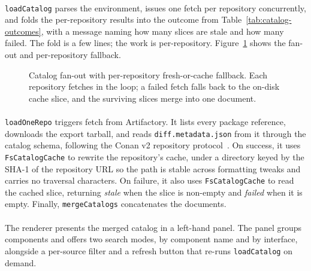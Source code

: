 \paragraph{}
\texttt{loadCatalog} parses the environment, issues one fetch per repository concurrently, and folds the per-repository results into the outcome from Table~\ref{tab:catalog-outcomes}, with a message naming how many slices are stale and how many failed. The fold is a few lines; the work is per-repository. Figure~\ref{fig:catalog-sequence} shows the fan-out and per-repository fallback.
\begin{figure}[H]
    \centering
    \resizebox{\textwidth}{!}{
        
    }
    \caption[Catalog fan-out with per-repository fresh-or-cache fallback.]{Catalog fan-out with per-repository fresh-or-cache fallback. Each repository fetches in the loop; a failed fetch falls back to the on-disk cache slice, and the surviving slices merge into one document.}
    \label{fig:catalog-sequence}
\end{figure}
\paragraph{}
\texttt{loadOneRepo} triggers fetch from Artifactory. It lists every package reference, downloads the export tarball, and reads \texttt{diff.metadata.json} from it through the catalog schema, following the Conan v2 repository protocol~\cite{conan}. On success, it uses \texttt{FsCatalogCache} to rewrite the repository's cache, under a directory keyed by the SHA-1 of the repository URL so the path is stable across formatting tweaks and carries no traversal characters. On failure, it also uses \texttt{FsCatalogCache} to read the cached slice, returning \textit{stale} when the slice is non-empty and \textit{failed} when it is empty. Finally, \texttt{mergeCatalogs} concatenates the documents.

\pagebreak

\paragraph{}
The renderer presents the merged catalog in a left-hand panel. The panel groups components and offers two search modes, by component name and by interface, alongside a per-source filter and a refresh button that re-runs \texttt{loadCatalog} on demand.

